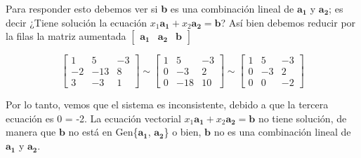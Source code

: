 \documentclass{article}
\begin{document}
Para responder esto debemos ver si \textbf{b} es una combinación lineal de $\mathbf{a_1}$ y $\mathbf{a_2}$; es decir ¿Tiene solución la ecuación $x_1\mathbf{a_1} + x_2\mathbf{a_2} = \mathbf{b}$? Así bien debemos reducir por la filas la matriz aumentada $\begin{bmatrix} \mathbf{a_1} & \mathbf{a_2} & \mathbf{b} \end{bmatrix}$

\begin{equation*}
    \left[\begin{array}{rr|r}
    1 & 5 & -3 \\
    -2 & -13 & 8 \\
    3 & -3 & 1
    \end{array}\right] \sim\left[\begin{array}{rr|r}
    1 & 5 & -3 \\
    0 & -3 & 2 \\
    0 & -18 & 10
    \end{array}\right] \sim\left[\begin{array}{rr|r}
    1 & 5 & -3 \\
    0 & -3 & 2 \\
    0 & 0 & -2
    \end{array}\right]
\end{equation*}

Por lo tanto, vemos que el sistema es inconsistente, debido a que la tercera ecuación es  0 = -2. La ecuación vectorial $x_1\mathbf{a_1} + x_2\mathbf{a_2} = \mathbf{b}$ no tiene solución, de manera que $\mathbf{b}$ no está en Gen\{$\mathbf{a_1}$, $\mathbf{a_2}$\} o bien, $\mathbf{b}$ no es una combinación lineal de $\mathbf{a_1}$ y $\mathbf{a_2}$. \cite{DavidC}

\pagebreak

\end{document}
